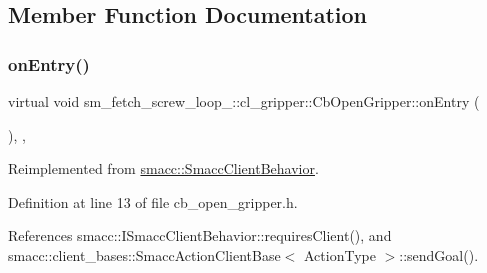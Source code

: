 \subsection{Member Function Documentation}
\mbox{\label{classsm__fetch__screw__loop__1_1_1cl__gripper_1_1CbOpenGripper_a2d50cf912c699839eda7c15a490e0b9f}} 
\subsubsection{\texorpdfstring{on\+Entry()}{onEntry()}}
{\footnotesize\ttfamily virtual void sm\+\_\+fetch\+\_\+screw\+\_\+loop\+\_\+::cl\+\_\+gripper\+::\+Cb\+Open\+Gripper\+::on\+Entry (\begin{DoxyParamCaption}{ }\end{DoxyParamCaption})\hspace{0.3cm}{\ttfamily [inline]}, {\ttfamily [override]}, {\ttfamily [virtual]}}



Reimplemented from \hyperlink{classsmacc_1_1SmaccClientBehavior_ad5d3e1f1697c3cfe66c94cadba948493}{smacc\+::\+Smacc\+Client\+Behavior}.



Definition at line 13 of file cb\+\_\+open\+\_\+gripper.\+h.



References smacc\+::\+I\+Smacc\+Client\+Behavior\+::requires\+Client(), and smacc\+::client\+\_\+bases\+::\+Smacc\+Action\+Client\+Base$<$ Action\+Type $>$\+::send\+Goal().


